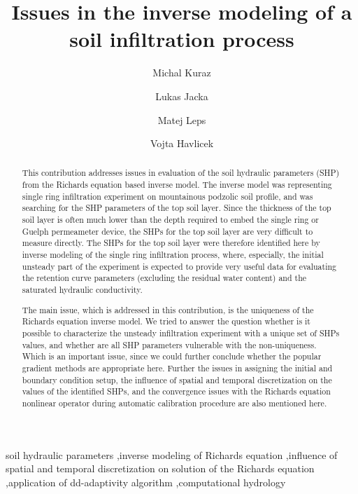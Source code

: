 \documentclass[review]{myarticle}
\begin{document}
\begin{frontmatter}

\title{Issues in the inverse modeling of a soil infiltration process}

\author[autor1]{Michal Kuraz}

\author[autor1]{Lukas Jacka}

\author[autor2]{Matej Leps}

\author[autor1]{Vojta Havlicek}

\address[autor1]{Czech University of Life Sciences Prague, Faculty of Environmental Sciences, Department of Water Resources and Environmental Modeling}

\address[autor2]{Czech Technical University in Prague, Faculty of Civil Engineering, Department of Mechanics}

\begin{abstract}
This contribution addresses issues in evaluation of the soil hydraulic parameters (SHP) from the Richards equation based inverse model. The inverse model was representing single ring infiltration experiment on mountainous podzolic soil profile, and was searching for the SHP parameters of the top soil layer. Since the thickness of the top soil layer is often much lower than the depth required to embed the single ring or Guelph permeameter device, the SHPs for the top soil layer are very difficult to measure directly. The SHPs for the top soil layer were therefore identified here by inverse modeling of the single ring infiltration process, where, especially, the initial unsteady part of the experiment is expected to provide very useful data for evaluating the retention curve parameters (excluding the residual water content) and the saturated hydraulic conductivity. 

The main issue, which is addressed in this contribution, is the uniqueness of the Richards equation inverse model. We tried to answer the question whether is it possible to characterize the unsteady infiltration experiment with a unique set of SHPs values, and whether are all SHP parameters vulnerable with the non-uniqueness. Which is an important issue, since we could further conclude whether the popular gradient methods are appropriate here. Further the issues in assigning the initial and boundary condition setup, the influence of spatial and temporal discretization on the values of the identified SHPs, and the convergence issues with the Richards equation nonlinear operator during automatic calibration procedure are also mentioned here.
\end{abstract}

\begin{keyword}
soil hydraulic parameters \sep inverse modeling of Richards equation \sep influence of spatial and temporal discretization on  solution of the Richards equation \sep application of dd-adaptivity algorithm \sep computational hydrology


\end{keyword}

\end{frontmatter}
\end{document}
